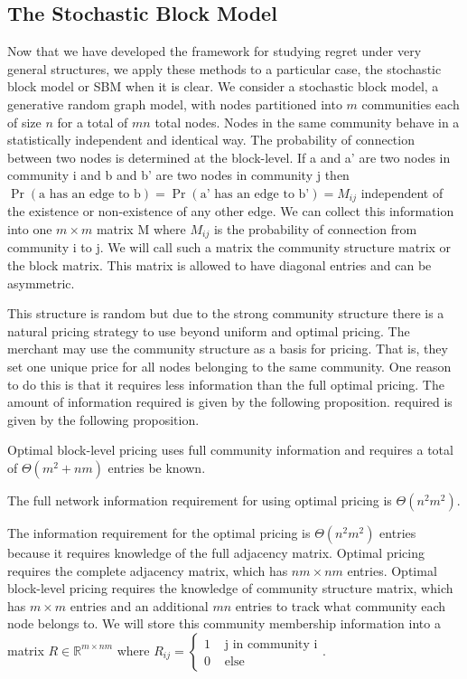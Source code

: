 \subsection{The Stochastic Block Model}
Now that we have developed the framework for studying regret under very general structures, we apply these methods to a particular case, the stochastic block model or SBM when it is clear.  We consider a stochastic block model, a generative random graph model, with nodes partitioned into $m$ communities each of size $n$ for a total of $mn$ total nodes. Nodes in the same community behave in a statistically independent and identical way. The probability of connection between two nodes is determined at the block-level. If a and a' are two nodes in community i and b and b' are two nodes in community j then $\Pr(\text{a has an edge to b}) = \Pr(\text{a' has an edge to b'}) = M_{ij}$ independent of the existence or non-existence of any other edge. We can collect this information into one $m \times m$ matrix M where $M_{ij}$  is the probability of connection from community i to j. We will call such a matrix the community structure matrix or the block matrix. This matrix is allowed to have diagonal entries and can be asymmetric.  


This structure is random but due to the strong community structure there is a natural pricing strategy to use beyond uniform and optimal pricing. The merchant may use the community structure as a basis for pricing. That is, they set one unique price for all nodes belonging to the same community. One reason to do this is that it requires less information than the full optimal pricing. The amount of information required is given by the following proposition. required is given by the following proposition. 
\begin{proposition}
        Optimal block-level pricing uses full community information and requires a total of  $\Theta ( m^2 + nm )$ entries be known. 
    
    The full network information requirement for using optimal pricing is $\Theta( n^2 m^2 )$.
\end{proposition}

The information requirement for the optimal pricing is $\Theta(n^2 m^2)$ entries because it requires knowledge of the full adjacency matrix. Optimal pricing requires the complete adjacency matrix, which has $nm \times nm$ entries. Optimal block-level pricing requires the knowledge of community structure matrix, which has $m \times m$ entries and an additional $mn$ entries to track what community each node belongs to. We will store this community membership information into a matrix $R \in \mathbb{R}^{m \times nm}$ where $R_{ij} = \begin{cases} 1 & \text{ j in community i} \\ 0 & \text{ else} \end{cases} $.

